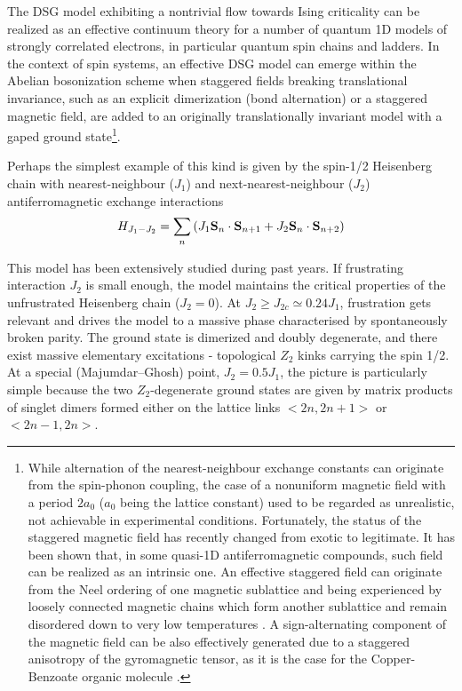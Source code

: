 The DSG model exhibiting a nontrivial flow towards Ising criticality
can be realized as an effective continuum theory for
a number of quantum 1D models of strongly correlated
electrons, in particular quantum spin chains and ladders.
In the context of spin systems, an effective DSG model
can emerge within the Abelian bosonization scheme
when staggered fields
breaking translational invariance, such as an explicit dimerization
(bond alternation)\cite{aff-conf} or a staggered magnetic field,
are added to an originally translationally invariant model with a gaped
ground state\footnote{While alternation of the nearest-neighbour exchange constants can originate from the spin-phonon coupling,  the case of a nonuniform magnetic field with  a period $2a_0$ ($a_0$ being the lattice constant) used to be regarded as unrealistic, not achievable in experimental conditions. Fortunately, the status of the staggered magnetic field has recently changed from exotic to legitimate. It has been shown that, in some quasi-1D antiferromagnetic compounds, such field can be realized as an intrinsic one. An effective  staggered field can originate from the Neel ordering of one magnetic sublattice and being experienced by loosely connected magnetic chains which form another sublattice and remain disordered down to very low temperatures \cite{MZ}. A sign-alternating component of the magnetic field can be also  effectively generated due to a staggered anisotropy of the gyromagnetic tensor, as it is the case for the Copper-Benzoate organic molecule \cite{benzoate}.}.

Perhaps the simplest example of this kind is given by
the spin-1/2 Heisenberg chain with nearest-neighbour ($J_1$) and
next-nearest-neighbour ($J_2$) antiferromagnetic exchange interactions
\begin{equation}
H_{J_1-J_2} = \sum_n \left(J_1 {\bf S}_n \cdot{\bf S}_{n+1}
+ J_2 {\bf S}_n \cdot{\bf S}_{n+2} \right)
\label{J1J2lattice}
\end{equation}

This model
has been extensively studied during past years. If frustrating interaction
$J_2$ is small enough, the model maintains the critical properties of the
unfrustrated Heisenberg chain ($J_2 = 0$).
At $J_2 \geq J_{2c}\simeq 0.24 J_1$, frustration
gets relevant and drives the model to a massive phase characterised by
spontaneously broken parity\cite{j1j2,WA}. The ground state is dimerized and
doubly
degenerate, and there exist massive elementary excitations - topological
$Z_2$ kinks carrying the spin 1/2. At a special (Majumdar--Ghosh)
point, $J_2 = 0.5 J_1$, the picture is particularly simple because
the two $Z_2$-degenerate ground states are given by
matrix products of singlet dimers formed either on the lattice
links $<2n,2n+1>$ or $<2n-1,2n>$.

